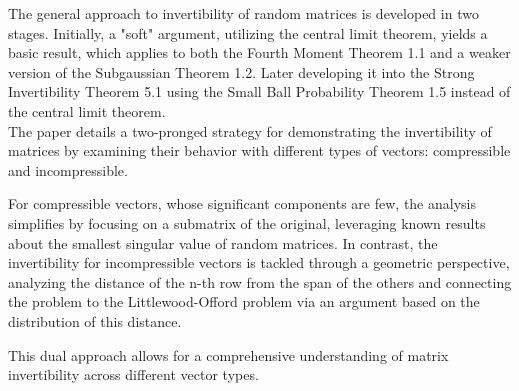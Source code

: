 The general approach to invertibility of random matrices is developed in two stages. Initially, a "soft" argument, utilizing the central limit theorem, yields a basic result, which applies to both the Fourth Moment Theorem 1.1 and a weaker version of the Subgaussian Theorem 1.2. Later developing it into the Strong Invertibility Theorem 5.1 using the Small Ball Probability Theorem 1.5 instead of the central limit theorem.\\

The paper details a two-pronged strategy for demonstrating the invertibility of matrices by examining their behavior with different types of vectors: compressible and incompressible.

For compressible vectors, whose significant components are few, the analysis simplifies by focusing on a submatrix of the original, leveraging known results about the smallest singular value of random matrices.
In contrast, the invertibility for incompressible vectors is tackled through a geometric perspective, analyzing the distance of the n-th row from the span of the others and connecting the problem to the Littlewood-Offord problem via an argument based on the distribution of this distance.

This dual approach allows for a comprehensive understanding of matrix invertibility across different vector types.
